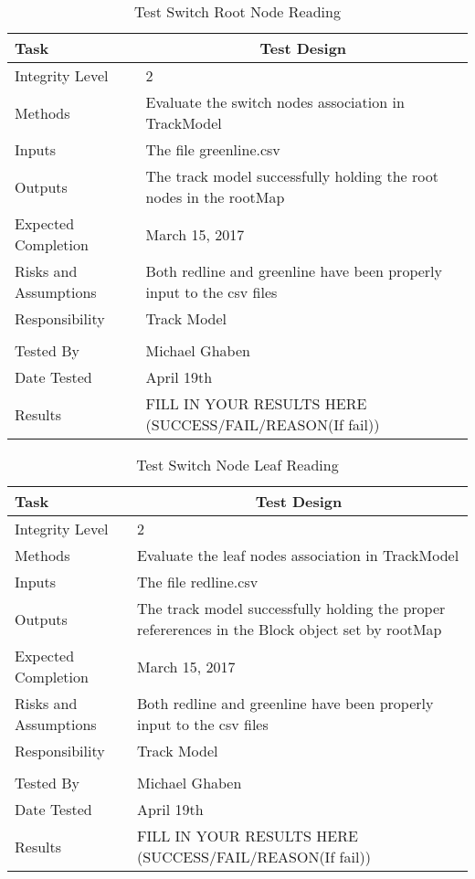 \documentclass[]{article}
\begin{document}
\begin{table}[H]
	\centering
	\caption{Test Switch Root Node Reading}
	\begin{tabular}{|l|l|}
		\hline
		Task & \multicolumn{1}{c|}{Test Design} \\ \hline
		Integrity Level & 2 \\ \hline
		Methods & Evaluate the switch nodes association in TrackModel\\ \hline
		Inputs &  The file greenline.csv \\ \hline
		Outputs &  The track model successfully holding the root nodes in the rootMap\\ \hline
		Expected Completion & March 15, 2017\\ \hline
		Risks and Assumptions & Both redline and greenline have been properly input to the csv files \\ \hline
		Responsibility & Track Model\\ \hline
		\\ \hline
		Tested By   &  Michael Ghaben\\	\hline
		Date Tested & \parbox[t]{10cm}{April 19th}\\ \hline
		Results & FILL IN YOUR RESULTS HERE (SUCCESS/FAIL/REASON(If fail))\\ \hline
	\end{tabular}
\end{table}

\begin{table}[H]
	\centering
	\caption{Test Switch Node Leaf Reading}
	\begin{tabular}{|l|l|}
		\hline
		Task & \multicolumn{1}{c|}{Test Design} \\ \hline
		Integrity Level & 2 \\ \hline
		Methods & Evaluate the leaf nodes association in TrackModel\\ \hline
		Inputs &  The file redline.csv \\ \hline
		Outputs & \parbox[t]{10cm}{ The track model successfully holding the proper refererences in the Block object set by rootMap}\\ \hline
		Expected Completion & March 15, 2017\\ \hline
		Risks and Assumptions & Both redline and greenline have been properly input to the csv files \\ \hline
		Responsibility & Track Model\\ \hline
		\\ \hline
		Tested By   &  Michael Ghaben\\	\hline
		Date Tested & \parbox[t]{10cm}{April 19th}\\ \hline
		Results & FILL IN YOUR RESULTS HERE (SUCCESS/FAIL/REASON(If fail))\\ \hline
	\end{tabular}
\end{table}
\end{document}
